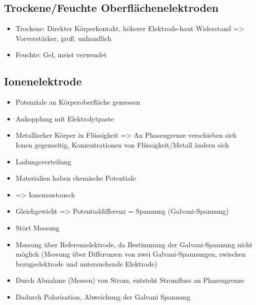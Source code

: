 \documentclass[a4paper,10pt,oneside]{article}
\begin{document}
\subsection{Trockene/Feuchte Oberflächenelektroden}
\begin{itemize}
	\item Trockene: Direkter Körperkontakt, höherer Elektrode-haut Widerstand => Vorverstärker, groß, unhandlich
	\item Feuchte: Gel, meist verwendet
\end{itemize}

\subsection{Ionenelektrode}
\begin{itemize}
	\item Potenziale an Körperoberfläche gemessen
	\item Ankopplung mit Elektrolytpaste
	\item Metallischer Körper in Flüssigkeit => An Phasengrenze verschieben sich Ionen gegenseitig, Konzentrationen von Flüssigkeit/Metall ändern sich
	\item Ladungsverteilung
	\item Materialien haben chemische Potentiale
	\item => Ionenaustausch
	\item Gleichgewicht => Potentialdifferenz = Spannung (Galvani-Spannung)
	\item Stört Messung
	\item Messung über Referenzelektrode, da Bestimmung der Galvani-Spannung nicht möglich (Messung über Differenzen von zwei Galvani-Spannungen, zwischen bezugselektrode und untersuchende Elektrode)
	\item Durch Abnahme (Messen) von Strom, entsteht Stromfluss an Phasengrenze
	\item Dadurch Polarisation, Abweichung der Galvani Spannung
\end{itemize}
\end{document}
